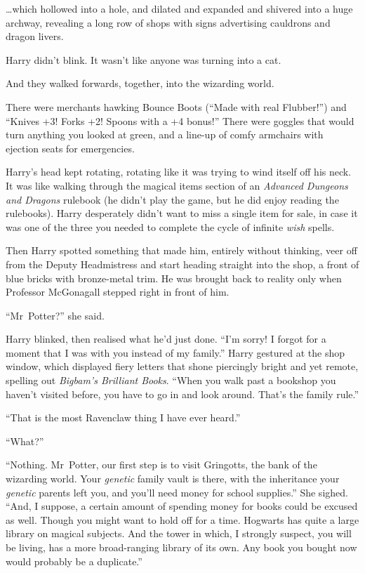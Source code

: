 …which hollowed into a hole, and dilated and expanded and shivered into a huge archway, revealing a long row of shops with signs advertising cauldrons and dragon livers.

Harry didn’t blink. It wasn’t like anyone was turning into a cat.

And they walked forwards, together, into the wizarding world.

There were merchants hawking Bounce Boots (“Made with real Flubber!”) and
“Knives +3! Forks +2! Spoons with a +4 bonus!” There were goggles that would turn anything you looked at green, and a line-up of comfy armchairs with ejection seats for emergencies.

Harry’s head kept rotating, rotating like it was trying to wind itself off his neck. It was like walking through the magical items section of an \emph{Advanced Dungeons and Dragons} rulebook (he didn’t play the game, but he did enjoy reading the rulebooks). Harry desperately didn’t want to miss a single item for sale, in case it was one of the three you needed to complete the cycle of infinite \emph{wish} spells.

Then Harry spotted something that made him, entirely without thinking, veer off from the Deputy Headmistress and start heading straight into the shop, a front of blue bricks with bronze-metal trim. He was brought back to reality only when Professor McGonagall stepped right in front of him.

“Mr~Potter?” she said.

Harry blinked, then realised what he’d just done.
“I’m sorry! I forgot for a moment that I was with you instead of my family.” Harry gestured at the shop window, which displayed fiery letters that shone piercingly bright and yet remote, spelling out \emph{Bigbam’s Brilliant Books}.
“When you walk past a bookshop you haven’t visited before, you have to go in and look around. That’s the family rule.”

“That is the most Ravenclaw thing I have ever heard.”

“What?”

“Nothing. Mr~Potter, our first step is to visit Gringotts, the bank of the wizarding world. Your \emph{genetic} family vault is there, with the inheritance your \emph{genetic} parents left you, and you’ll need money for school supplies.” She sighed.
“And, I suppose, a certain amount of spending money for books could be excused as well. Though you might want to hold off for a time. Hogwarts has quite a large library on magical subjects. And the tower in which, I strongly suspect, you will be living, has a more broad-ranging library of its own. Any book you bought now would probably be a duplicate.”

